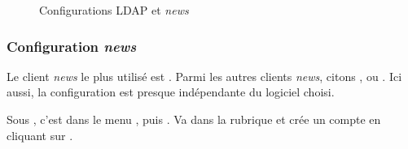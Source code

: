   \begin{figure}[!h]
    \begin{center}  
	\caption{Configurations LDAP et \emph{news}}
    \end{center}
 \end{figure}



\subsubsection{Configuration \emph{news}}

 Le client \emph{news} le plus utilis\'e est . Parmi les autres clients \emph{news}, citons 
,  ou . Ici aussi, la configuration est presque ind\'ependante du logiciel choisi.


Sous , c'est dans le menu , puis . Va dans la rubrique  et
cr\'ee un compte en cliquant sur .

